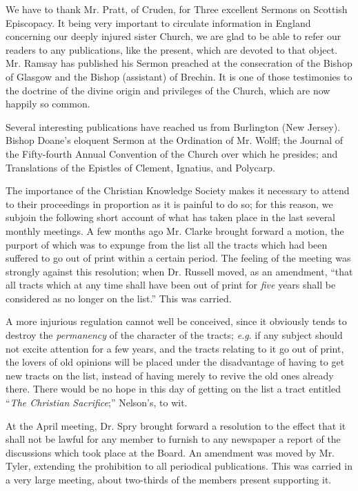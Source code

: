 We have to thank Mr. Pratt, of Cruden, for Three
excellent Sermons on Scottish Episcopacy. It being very important to
circulate information in England concerning our deeply injured sister
Church, we are glad to be able to refer our readers to any publications,
like the present, which are devoted to that object. Mr. Ramsay has
published his Sermon preached at the consecration of the Bishop of
Glasgow and the Bishop (assistant) of Brechin. It is one of those
testimonies to the doctrine of the divine origin and privileges of the
Church, which are now happily so common.

Several interesting publications have reached us
from Burlington (New Jersey). Bishop Doane's eloquent Sermon at the
Ordination of Mr. Wolff; the Journal of the Fifty-fourth Annual
Convention of the Church over which he presides; and Translations of the
Epistles of Clement, Ignatius, and Polycarp.

The importance of the Christian Knowledge Society
makes it necessary to attend to their proceedings in proportion as it is
painful to do so; for this reason, we subjoin the following short
account of what has taken place in the last several monthly meetings. A
few months ago Mr. Clarke brought forward a motion, the purport of which
was to expunge from the list all the tracts which had been suffered to
go out of print within a certain period. The feeling of the meeting was
strongly against this resolution; when Dr. Russell moved, as an
amendment, ``that all tracts which at any time shall have been out of
print for \emph{five} years shall be considered as no longer on the
list.'' This was carried.

A more injurious regulation cannot well be
conceived, since it obviously tends to destroy the \emph{permanency} of
the character of the tracts; \emph{e.g}. if any subject should not
excite attention for a few years, and the tracts relating to it go out
of print, the lovers of old opinions will be placed under the
disadvantage of having to get new tracts on the list, instead of having
merely to revive the old ones already there. There would be no hope in
this day of getting on the list a tract entitled ``\emph{The Christian
Sacrifice};'' Nelson's, to wit.

At the April meeting, Dr. Spry brought forward a
resolution to the effect that it shall not be lawful for any member to
furnish to any newspaper a report of the discussions which took place at
the Board. An amendment was moved by Mr. Tyler, extending the
prohibition to all periodical publications. This was carried in a very
large meeting, about two-thirds of the members present supporting it.

